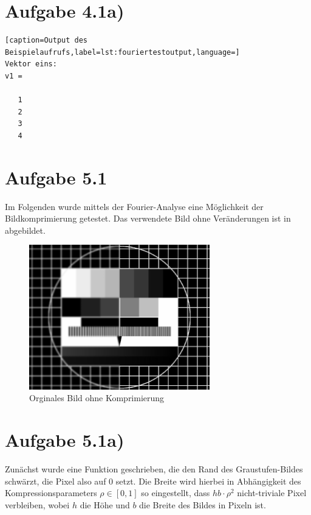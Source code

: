 \section*{Aufgabe 4.1a)}
\begin{lstlisting}[caption=Output des Beispielaufrufs,label=lst:fouriertestoutput,language=]
Vektor eins: 
v1 =

   1
   2
   3
   4
\end{lstlisting}



\section*{Aufgabe 5.1}
Im Folgenden wurde mittels der Fourier-Analyse eine Möglichkeit der Bildkomprimierung
getestet. Das verwendete Bild ohne Veränderungen ist in  abgebildet.

\begin{figure}[htb]
\centering
  \includegraphics[width=0.7\textwidth,keepaspectratio]{../tmp/testbild.pdf}
  \caption{Orginales Bild ohne Komprimierung}
  \label{fig:orig}
\end{figure}

\section*{Aufgabe 5.1a)}

Zunächst wurde eine Funktion  geschrieben, die den Rand des Graustufen-Bildes
schwärzt, die Pixel also auf 0 setzt. Die Breite wird hierbei in Abhängigkeit
des Kompressionsparameters $ρ \in [0,1]$ so eingestellt, dass $hb\cdot ρ^2$
nicht-triviale Pixel verbleiben, wobei $h$ die Höhe und $b$ die Breite des
Bildes in Pixeln ist.



